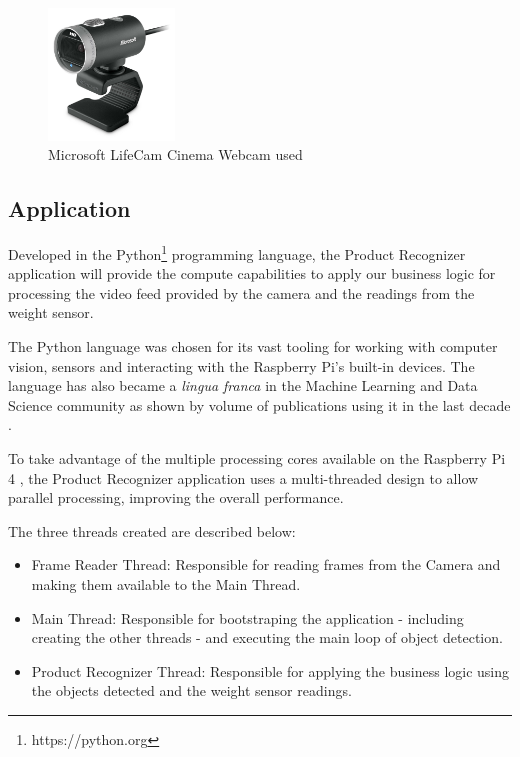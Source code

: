 \documentclass[openright]{normas-utf-tex} %
\begin{document}
\begin{figure}[H]
	\centering
	\includegraphics[width=0.3\textwidth]{./images/webcam.jpg}
    \caption[Microsoft LifeCam Cinema Webcam used]{Microsoft LifeCam Cinema Webcam used}
\end{figure}

\subsection{Application}

Developed in the Python\footnote{https://python.org} programming language, the
Product Recognizer application will provide the compute capabilities to apply
our business logic for processing the video feed provided by the camera and the
readings from the weight sensor.

The Python language was chosen for its vast tooling for working with computer
vision, sensors and interacting with the Raspberry Pi's built-in devices. The
language has also became a \textit{lingua franca} in the Machine Learning and
Data Science community as shown by volume of publications using it in the last
decade \cite{Wes2017,Joel2019,Andreas2016}.

To take advantage of the multiple processing cores available on the Raspberry
Pi 4 , the Product Recognizer application uses a
multi-threaded design to allow parallel processing, improving the overall
performance.

The three threads created are described below:
\begin{itemize}
    \item Frame Reader Thread: Responsible for reading frames from the Camera and making them available to the Main Thread.
    \item Main Thread: Responsible for bootstraping the application - including creating the other threads - and executing the main loop of
        object detection.
    \item Product Recognizer Thread: Responsible for applying the business logic using the objects detected and the weight sensor readings.
\end{itemize}
\end{document}
